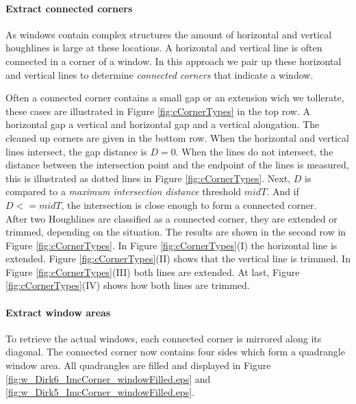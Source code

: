 \paragraph{Extract connected corners}
 As windows contain complex structures
the amount of horizontal and vertical houghlines is large at these locations.
A horizontal and vertical line is often connected in a corner of a window.  In
this approach we pair up these horizontal and vertical lines to determine
\emph{connected corners} that indicate a window.

Often a connected corner contains a small gap or an extension wich we tollerate,
these cases are illustrated in Figure \ref{fig:cCornerTypes} in the top row.
A horizontal gap a vertical and horizontal gap and a vertical alongation. The
cleaned up corners are given in the bottom row.  When the horizontal and
vertical lines intersect, the gap distance is $D=0$.  When the lines do not
intersect, the distance between the intersection point and the endpoint of the
lines is measured, this is illustrated as dotted lines in Figure
\ref{fig:cCornerTypes}.  Next, $D$ is compared to a \emph{maximum intersection
distance} threshold $midT$.  And if $D<=midT$, the intersection is close enough
to form a connected corner.\\

After two Houghlines are classified as a connected corner, they are extended or
trimmed, depending on the situation. The results are shown in the second row in
Figure \ref{fig:cCornerTypes}.
In Figure \ref{fig:cCornerTypes}(I)  the horizontal line is extended.  Figure
\ref{fig:cCornerTypes}(II) shows that the vertical line is trimmed.  In Figure
\ref{fig:cCornerTypes}(III) both lines are extended.  At last, Figure
\ref{fig:cCornerTypes}(IV) shows how both lines are trimmed.


\paragraph{Extract window areas}
To retrieve the actual windows, each connected corner is mirrored along its
diagonal. The connected corner now contains four sides which form a 
quadrangle window area.
All quadrangles are filled and displayed in Figure
\ref{fig:w_Dirk6_ImcCorner_windowFilled.eps} and
\ref{fig:w_Dirk5_ImcCorner_windowFilled.eps}.

